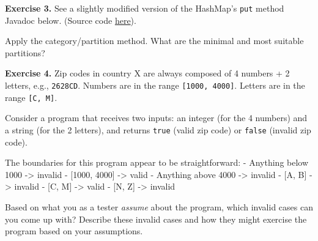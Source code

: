 \textbf{Exercise 3.} See a slightly modified version of the HashMap's
\texttt{put} method Javadoc below. (Source code
\href{http://developer.classpath.org/doc/java/util/HashMap-source.html}{here}).

\begin{Shaded}
\begin{Highlighting}[]
\CommentTok{/**}
\CommentTok{*}\CommentTok{,}
\CommentTok{*}
\CommentTok{*}\CommentTok{,}
\CommentTok{*}
\CommentTok{*}
\CommentTok{*} \CommentTok{:}\CommentTok{;}
\CommentTok{*}
\CommentTok{*}
\CommentTok{*} 
\CommentTok{*} 
\CommentTok{*} \CommentTok{,}
\CommentTok{*/}
\NormalTok{\}}
\end{Highlighting}
\end{Shaded}

Apply the category/partition method. What are the minimal and most
suitable partitions?

\textbf{Exercise 4.} Zip codes in country X are always composed of 4
numbers + 2 letters, e.g., \texttt{2628CD}. Numbers are in the range
\texttt{{[}1000,\ 4000{]}}. Letters are in the range
\texttt{{[}C,\ M{]}}.

Consider a program that receives two inputs: an integer (for the 4
numbers) and a string (for the 2 letters), and returns \texttt{true}
(valid zip code) or \texttt{false} (invalid zip code).

The boundaries for this program appear to be straightforward: - Anything
below 1000 -\textgreater{} invalid - {[}1000, 4000{]} -\textgreater{}
valid - Anything above 4000 -\textgreater{} invalid - {[}A, B{]}
-\textgreater{} invalid - {[}C, M{]} -\textgreater{} valid - {[}N, Z{]}
-\textgreater{} invalid

Based on what you as a tester \emph{assume} about the program, which
invalid cases can you come up with? Describe these invalid cases and how
they might exercise the program based on your assumptions.

